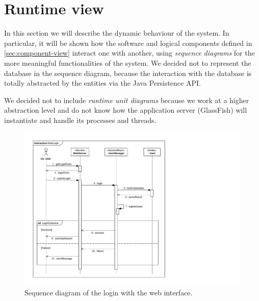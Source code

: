 \section{Runtime view}
\label{sec:runtime-view}

In this section we will describe the dynamic behaviour of the system.
In particular, it will be shown how the software and logical components defined in \autoref{sec:component-view} interact one with another, using \emph{sequence diagrams} for the more meaningful functionalities of the system.
We decided not to represent the database in the sequence diagram, because the interaction with the database is totally abstracted by the entities via the Java Persistence API.

We decided not to include \emph{runtime unit diagrams} because we work at a higher abstraction level and do not know how the application server (GlassFish) will instantiate and handle its processes and threads.

\begin{figure}[h]
    \centering
    \includegraphics[width=\textwidth]{diagrams/sequence_weblogin}
    \caption{Sequence diagram of the login with the web interface.}
    \label{fig:sequence-weblogin}
\end{figure}

